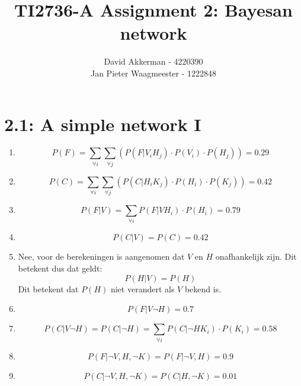 \documentclass[a4paper,10pt,fleqn]{article}
\title{TI2736-A Assignment 2:  Bayesan network}
\author{
    David Akkerman - 4220390 \\
    Jan Pieter Waagmeester - 1222848 \\
}
\begin{document}
\maketitle

\section*{2.1: A simple network I}
\begin{enumerate}[1.]
    \item $$P(F) = \sum_{\forall i} \sum_{\forall j} (P(F|V_iH_j) \cdot P(V_i) \cdot P(H_j)) = 0.29$$

    \item $$P(C) = \sum_{\forall i} \sum_{\forall j} (P(C|H_iK_j) \cdot P(H_i) \cdot P(K_j)) = 0.42 $$


    \item $$P(F|V) = \sum_{\forall i} P(F|VH_i) \cdot P(H_i) = 0.79 $$

    \item $$P(C|V) = P(C) = 0.42$$

    \item Nee, voor de berekeningen is aangenomen dat $V$ en $H$ onafhankelijk zijn. Dit betekent dus dat geldt: $$P(H|V) = P(H)$$ Dit betekent dat $P(H)$ niet verandert als $V$ bekend is.

    \item $$P(F|V\lnot H) = 0.7$$

    \item $$P(C|V\lnot H) = P(C|\lnot H) = \sum_{\forall i} P(C|\lnot HK_i) \cdot P(K_i) = 0.58     $$

    \item $$P(F|\lnot V, H, \lnot K) = P(F|\lnot V,H) = 0.9 $$

    \item $$P(C|\lnot V, H, \lnot K) = P(C|H,\lnot K) = 0.01    $$

\end{enumerate}
\end{document}
